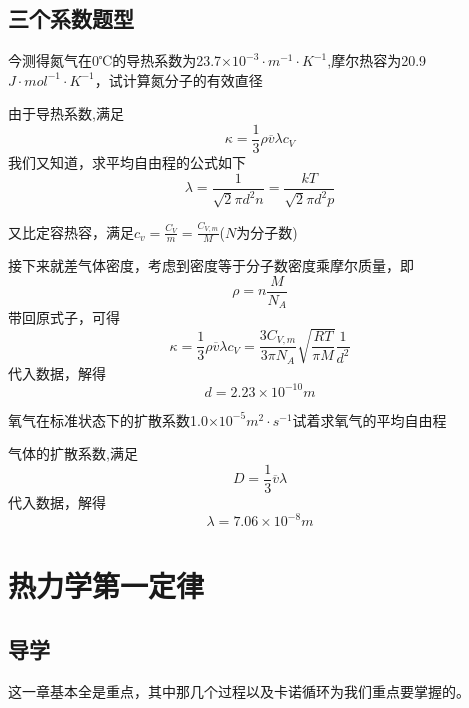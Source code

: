\documentclass[lang=cn,10pt]{elegantbook}
\begin{document}
	\section{三个系数题型}
	\begin{example}
		今测得氮气在0℃的导热系数为23.7$\times 10^{-3}\cdot m^{-1}\cdot K^{-1} $,摩尔热容为20.9$J\cdot mol^{-1}\cdot K^{-1}$，试计算氮分子的有效直径
	\end{example}
	\begin{solution}
		由于导热系数,满足
		\begin{equation*}
			\kappa =\frac{1}{3}\rho \overline{v}\lambda c_{V}
		\end{equation*}
		我们又知道，求平均自由程的公式如下
		\begin{equation*}
			\lambda=\frac{1}{\sqrt{2}\pi d^{2}n}=\frac{kT}{\sqrt{2}\pi d^{2}p}
		\end{equation*}
		
		又比定容热容，满足$c_{v}=\frac{C_{V}}{m}=\frac{C_{V,m}}{M}$($N$为分子数)
		
		接下来就差气体密度，考虑到密度等于分子数密度乘摩尔质量，即
		\begin{equation*}
			\rho=n\frac{M}{N_{A}}
		\end{equation*}
		带回原式子，可得
		\begin{equation*}
			\kappa =\frac{1}{3}\rho \overline{v}\lambda c_{V}=\frac{3C_{V,m}}{3\pi N_{A}}\sqrt{\frac{RT}{\pi M}}\frac{1}{d^{2}}
		\end{equation*}
		代入数据，解得
		\begin{equation*}
			d=2.23\times10^{-10}m
		\end{equation*}
	\end{solution}
	\begin{example}
		氧气在标准状态下的扩散系数1.0$\times 10^{-5} m^{2}\cdot s^{-1}$试着求氧气的平均自由程
	\end{example}
	\begin{solution}
		气体的扩散系数,满足
		\begin{equation*}
			D =\frac{1}{3}\overline{v}\lambda 
		\end{equation*}
		代入数据，解得
		\begin{equation*}
			\lambda=7.06\times10^{-8}m
		\end{equation*}
	\end{solution}
	\chapter{热力学第一定律}
	\section{导学}
	这一章基本全是重点，其中那几个过程以及卡诺循环为我们重点要掌握的。
\end{document}
